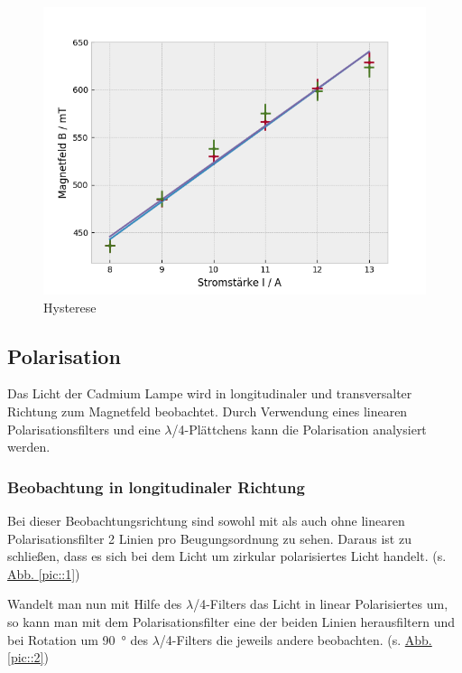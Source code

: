     \begin{figure}[H]
      \centering
      \includegraphics[width=.6\paperwidth]{Auswertung/hysteresis}
      \caption{Hysterese}
      \label{plot::1}
    \end{figure}

  \subsection{Polarisation}
    Das Licht der Cadmium Lampe wird in longitudinaler und transversalter Richtung zum Magnetfeld beobachtet. Durch Verwendung eines linearen Polarisationsfilters und eine $\lambda$/4-Plättchens kann die Polarisation analysiert werden.

    \subsubsection{Beobachtung in longitudinaler Richtung}
      Bei dieser Beobachtungsrichtung sind sowohl mit als auch ohne linearen Polarisationsfilter 2 Linien pro Beugungsordnung zu sehen. Daraus ist zu schließen, dass es sich bei dem Licht um zirkular polarisiertes Licht handelt. (s. \hyperref[pic::1]{Abb. \ref*{pic::1}})

      Wandelt man nun mit Hilfe des $\lambda$/4-Filters das Licht in linear Polarisiertes um, so kann man mit dem Polarisationsfilter eine der beiden Linien herausfiltern und bei Rotation um \SI{90}{°} des $\lambda$/4-Filters die jeweils andere beobachten. (s. \hyperref[pic::2]{Abb. \ref*{pic::2}})

